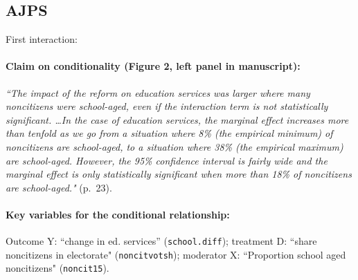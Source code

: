 \documentclass[12pt]{article}
\begin{document}
\clearpage





\subsection{\citet{Vernby2013} AJPS} \label{vernby}

\noindent First interaction:

\paragraph{Claim on conditionality (Figure 2, left panel in manuscript):} \emph{``The impact of the reform on education services was larger where many noncitizens were school-aged, even if the interaction term is not statistically significant. \ldots In the case of education services, the marginal effect increases more than tenfold as we go from a situation where 8\% (the empirical minimum) of noncitizens are school-aged, to a situation where 38\% (the empirical maximum) are school-aged. However, the 95\% confidence interval is fairly wide and the marginal effect is only statistically significant when more than 18\% of noncitizens are school-aged."} (p.\ 23). 

\paragraph{Key variables for the conditional relationship:} Outcome Y:
``change in ed. services'' (\texttt{school.diff}); treatment D: ``share noncitizens in electorate" (\texttt{noncitvotsh}); moderator X: ``Proportion school aged noncitizens"
(\texttt{noncit15}).


\newpage
\end{document}
